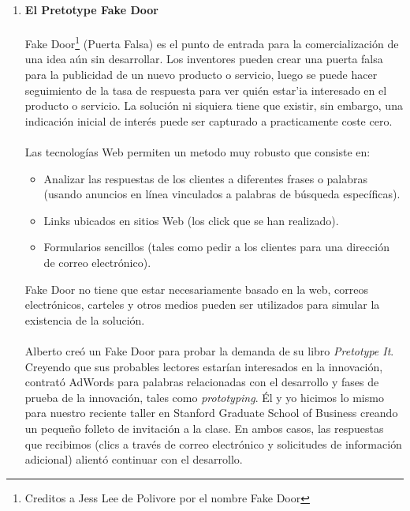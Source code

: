 \documentclass{article}
\begin{document}
\begin{enumerate}
\item \textbf{El Pretotype Fake Door}
\\ \\
Fake Door\footnote{Creditos a Jess Lee de Polivore por el nombre Fake Door} (Puerta Falsa) es el punto de entrada para la comercializaci\'on de una idea a\'un sin desarrollar. Los inventores pueden crear una puerta falsa para la publicidad de un nuevo producto o servicio, luego se puede hacer seguimiento de la tasa de respuesta para ver qui\'en estar'ia interesado en el producto o servicio. La soluci\'on ni siquiera tiene que existir, sin embargo, una indicaci\'on inicial de inter\'es puede ser capturado a practicamente coste cero.
\\ \\
Las tecnolog\'ias Web permiten un metodo muy robusto que consiste en:

\begin{itemize}

\item Analizar las respuestas de los clientes a diferentes frases o palabras (usando anuncios en l\'inea vinculados a palabras de b\'usqueda espec\'ificas).

\item Links ubicados en sitios Web (los click que se han realizado).

\item Formularios sencillos (tales como pedir a los clientes para una direcci\'on de correo electr\'onico).

\end{itemize}

Fake Door no tiene que estar necesariamente basado en la web, correos electr\'onicos, carteles y otros medios pueden ser utilizados para simular la existencia de la soluci\'on.
\\ \\
Alberto cre\'o un Fake Door para probar la demanda de su libro \textit{Pretotype It}. Creyendo que sus probables lectores estar\'ian interesados en la innovaci\'on, contrat\'o AdWords para palabras relacionadas con el desarrollo y fases de prueba de la innovaci\'on, tales como \textit{prototyping}. \'El y yo hicimos lo mismo para nuestro reciente taller en Stanford Graduate School of Business creando un peque\~no folleto de invitaci\'on a la clase. En ambos casos, las respuestas que recibimos (clics a trav\'es de correo electr\'onico y solicitudes de informaci\'on adicional) alient\'o continuar con el desarrollo.


\end{enumerate}
\end{document}
